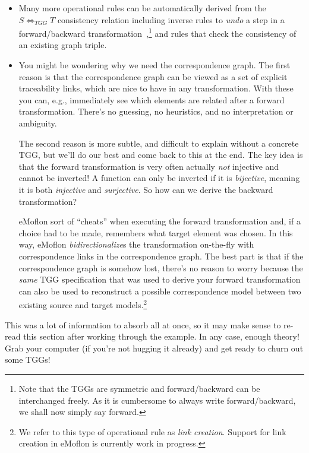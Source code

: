 \begin{itemize}

\item Many more operational rules can be automatically derived from the $S \Leftrightarrow_{TGG} T$ consistency relation including inverse rules to \emph{undo}
a step in a forward/backward transformation~\cite{LAVS_ICGT_2012},\footnote{Note that the TGGs are symmetric and forward/backward can be interchanged freely.
As it is cumbersome to always write forward/backward, we shall now simply say forward.} and rules that check the consistency of an existing graph triple.

\item You might be wondering why we need the correspondence graph. The first reason is that the correspondence graph can be viewed as a set of explicit
traceability links, which are nice to have in any transformation. With these you can, e.g., immediately see which elements are related after a forward
transformation. There's no guessing, no heuristics, and no interpretation or ambiguity.

\vspace{0.25cm}

The second reason is more subtle, and difficult to explain without a concrete TGG, but we'll do our best and come back to this at the end. The
key idea is that the forward transformation is very often actually \emph{not} injective and cannot be inverted! A function
can only be inverted if it is \emph{bijective}, meaning it is both \emph{injective} and \emph{surjective}. So how can we derive the backward
transformation?

\vspace{0.25cm}

eMoflon sort of ``cheats'' when executing the forward transformation and, if a choice had to be made, remembers what target element was chosen. In this way,
eMoflon \emph{bidirectionalize}s the transformation on-the-fly with correspondence links in the correspondence graph. The best part is that if the
correspondence graph is somehow lost, there's no reason to worry because the \emph{same} TGG specification that was used to derive your forward transformation
can also be used to reconstruct a possible correspondence model between two existing source and target models.\footnote{We refer to this type of operational
rule as \emph{link creation}. Support for link creation in eMoflon is currently work in progress.}

\end{itemize}
This was a lot of information to absorb all at once, so it may make sense to re-read this section after working through the example. In any case, enough theory!
Grab your computer (if you're not hugging it already) and get ready to churn out some TGGs!
